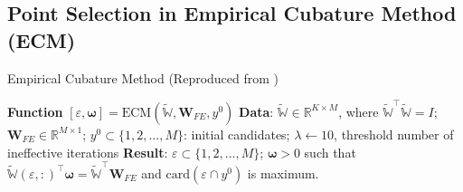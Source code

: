 \documentclass[11pt]{article}
\renewcommand{\vec}[1]{\mathbf{#1}}
\begin{document}
            \subsection{Point Selection in Empirical Cubature Method (ECM)}
            \begin{algorithm}[H]
                \caption{Empirical Cubature Method (Reproduced from \cite{bravo2024subspace})}
                \label{alg:ECM_PS}
                \begin{algorithmic}[1]
                    \STATE \textbf{Function} $[ \varepsilon, \boldsymbol\omega] = \text{ECM}(\widetilde{\mathbb{W}}, \vec{W}_{FE}, y^0)$
                    \STATE \textbf{Data}: $\widetilde{\mathbb{W}} \in \mathbb{R}^{K \times M}$, where $\widetilde{\mathbb{W}}^\top \widetilde{\mathbb{W}} = I$; $\vec{W}_{FE} \in \mathbb{R}^{M\times 1}$; $y^0 \subset \{1, 2, ..., M\}$: initial candidates; $\lambda \leftarrow 10$, threshold number of ineffective iterations
                    \STATE \textbf{Result}: $\varepsilon \subset \{1, 2, ..., M\}$; $\boldsymbol\omega > 0$ such that $ \widetilde{\mathbb{W}}(\varepsilon, :)^\top \boldsymbol\omega = \widetilde{\mathbb{W}}^\top \vec{W}_{FE}$ and $\text{card}(\varepsilon \cap y^0)$ is maximum.
                \end{algorithmic}
            \end{algorithm}
\end{document}
